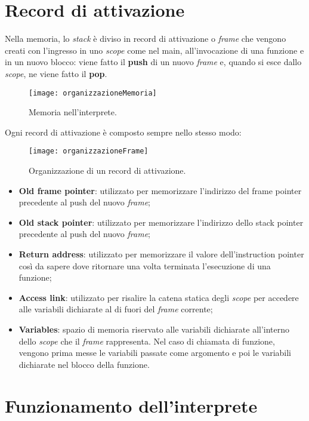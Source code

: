 \documentclass[../report.tex]{subfiles}
\begin{document}
\section{Record di attivazione}\label{s:record-di-attivazione}
Nella memoria, lo \textit{stack} \`e diviso in record di attivazione o \textit{frame} che vengono creati con l'ingresso in uno \textit{scope} come nel main, all'invocazione di una funzione e in un nuovo blocco: viene fatto il \textbf{push} di un nuovo \textit{frame} e, quando si esce dallo \textit{scope}, ne viene fatto il \textbf{pop}.
\begin{figure}[H]
    \centering
    \texttt{[image: organizzazioneMemoria]}
    \caption{Memoria nell'interprete.}
\end{figure}
Ogni record di attivazione \`e composto sempre nello stesso modo:
\begin{figure}[H]
    \centering
    \texttt{[image: organizzazioneFrame]}
    \caption{Organizzazione di un record di attivazione.}
\end{figure}
\begin{itemize}
    \item \textbf{Old frame pointer}: utilizzato per memorizzare l'indirizzo del frame pointer precedente al push del nuovo \textit{frame};
    \item \textbf{Old stack pointer}: utilizzato per memorizzare l'indirizzo dello stack pointer precedente al push del nuovo \textit{frame};
    \item \textbf{Return address}: utilizzato per memorizzare il valore dell'instruction pointer cos\`i da sapere dove ritornare una volta terminata l'esecuzione di una funzione;
    \item \textbf{Access link}: utilizzato per risalire la catena statica degli \textit{scope} per accedere alle variabili dichiarate al di fuori del \textit{frame} corrente;
    \item \textbf{Variables}: spazio di memoria riservato alle variabili dichiarate all'interno dello \textit{scope} che il \textit{frame} rappresenta. Nel caso di chiamata di funzione, vengono prima messe le variabili passate come argomento e poi le variabili dichiarate nel blocco della funzione.
\end{itemize}

\section{Funzionamento dell'interprete}\label{s:funzionamento-interprete}
\end{document}
